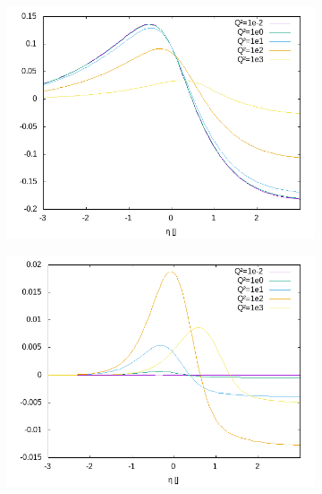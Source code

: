 \begin{figure}[ht!]
\centering
\begin{subfigure}[t]{.3\textwidth}
	\includegraphics[width=\textwidth]{../../img2/partonic/cgBar1_VV_F2}
\end{subfigure}%
\begin{subfigure}[t]{.3\textwidth}
	\includegraphics[width=\textwidth]{../../img2/partonic/cgBar1_VV_FL}
\end{subfigure}%
\begin{subfigure}[t]{.3\textwidth}

\end{subfigure}
\end{figure}
